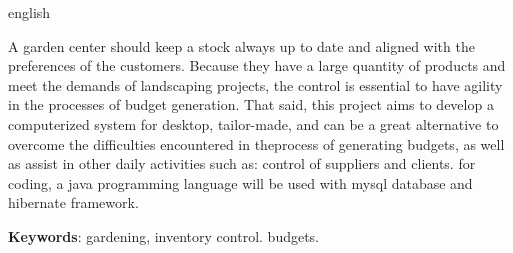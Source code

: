 \begin{resumo}[Abstract]
	\begin{otherlanguage*}{english}
		
		


A garden center should keep a stock always up to date and aligned with the preferences of the customers.
Because they have a large quantity of products and meet the demands of landscaping projects, the control is essential to have agility in the processes of budget generation.
That said, this project aims to develop a computerized system for desktop, tailor-made, and can be a great alternative to overcome the difficulties encountered in theprocess of generating budgets, as well as assist in other daily activities such as: control of suppliers and clients.
for coding, a java programming language will be used with mysql database and hibernate framework.



		
		
		
		\vspace{\onelineskip}
		
		\noindent 
		\textbf{Keywords}: gardening, inventory control. budgets.
	\end{otherlanguage*}
\end{resumo}